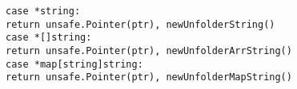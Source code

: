 \begin{lstlisting}[language=Golang, label=lst:labels-classexample-type-reflection, caption=Usage class example: type-reflection]
case *string:
return unsafe.Pointer(ptr), newUnfolderString()
case *[]string:
return unsafe.Pointer(ptr), newUnfolderArrString()
case *map[string]string:
return unsafe.Pointer(ptr), newUnfolderMapString()
\end{lstlisting}